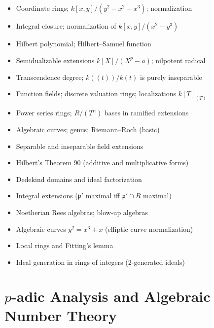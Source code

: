 \documentclass{amsart}
\begin{document}
\begin{itemize}
  \item Coordinate rings; $k[x,y]/(y^2-x^2-x^3)$; normalization
  \item Integral closure; normalization of $k[x,y]/(x^2-y^3)$
  \item Hilbert polynomial; Hilbert--Samuel function
  \item Semidualizable extensions $k[X]/(X^p-a)$; nilpotent radical
  \item Transcendence degree; $k((t))/k(t)$ is purely inseparable
  \item Function fields; discrete valuation rings; localizations $k[T]_{(T)}$
  \item Power series rings; $R/(T^n)$ bases in ramified extensions
  \item Algebraic curves; genus; Riemann--Roch (basic)
  \item Separable and inseparable field extensions
  \item Hilbert's Theorem 90 (additive and multiplicative forms)
  \item Dedekind domains and ideal factorization
  \item Integral extensions ($\mathfrak{p}'$ maximal iff $\mathfrak{p}' \cap R$ maximal)
  \item Noetherian Rees algebras; blow-up algebras
  \item Algebraic curves $y^2 = x^3+x$ (elliptic curve normalization)
  \item Local rings and Fitting's lemma
  \item Ideal generation in rings of integers ($2$-generated ideals)
\end{itemize}

\section{$p$-adic Analysis and Algebraic Number Theory}
\end{document}
